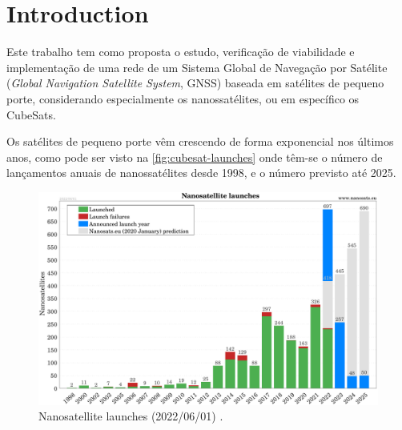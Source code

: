 %
%
%
%
%

%
%
%
%
%

\chapter{Introduction} \label{ch:introduction}

Este trabalho tem como proposta o estudo, verificação de viabilidade e implementação de uma rede de um Sistema Global de Navegação por Satélite (\textit{Global Navigation Satellite System}, GNSS) baseada em satélites de pequeno porte, considerando especialmente os nanossatélites, ou em específico os CubeSats.

Os satélites de pequeno porte vêm crescendo de forma exponencial nos últimos anos, como pode ser visto na \autoref{fig:cubesat-launches} onde têm-se o número de lançamentos anuais de nanossatélites desde 1998, e o número previsto até 2025.

\begin{figure}[!ht]
    \begin{center}
        \includegraphics[width=\columnwidth]{figures/Nanosats_years_2022-06-01}
        \caption{Nanosatellite launches (2022/06/01) \cite{nanosatseu}.}
        \label{fig:cubesat-launches}
    \end{center}
\end{figure}

